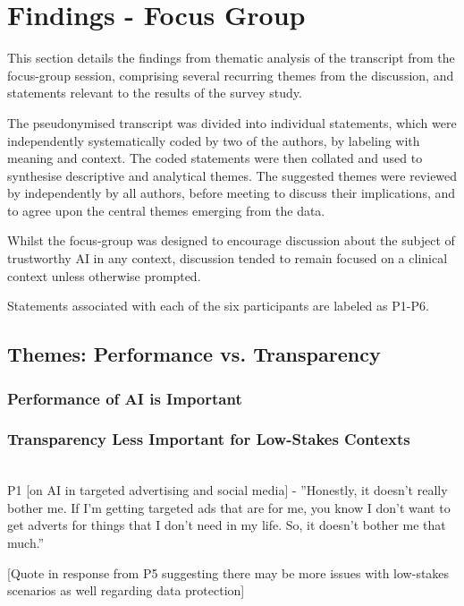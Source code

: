 \documentclass[manuscript,screen,review]{acmart}
\begin{document}
\section{Findings - Focus Group}

This section details the findings from thematic analysis of the transcript from the focus-group session, comprising several recurring themes from the discussion, and statements relevant to the results of the survey study. 

The pseudonymised transcript was divided into individual statements, which were independently systematically coded by two of the authors, by labeling with meaning and context. The coded statements were then collated and used to synthesise descriptive and analytical themes. The suggested themes were reviewed by independently by all authors, before meeting to discuss their implications, and to agree upon the central themes emerging from the data.    

Whilst the focus-group was designed to encourage discussion about the subject of trustworthy AI in any context, discussion tended to remain focused on a clinical context unless otherwise prompted.

Statements associated with each of the six participants are labeled as P1-P6. 


\subsection{Themes: Performance vs. Transparency}

\subsubsection{Performance of AI is Important}


\subsubsection{Transparency Less Important for Low-Stakes Contexts}\hfill\\

P1 [on AI in targeted advertising and social media] - ''Honestly, it doesn’t really bother me. If I'm getting targeted ads that are for me, you know I don’t want to get adverts for things that I don’t need in my life. So, it doesn’t bother me that much.''

[Quote in response from P5 suggesting there may be more issues with low-stakes scenarios as well regarding data protection]
\end{document}
